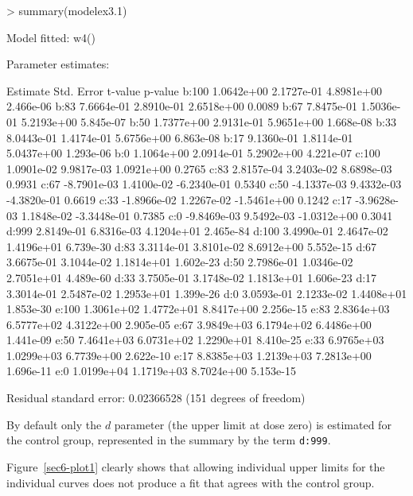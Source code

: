 \documentclass[a4paper]{article}
\begin{document}
\begin{Schunk}
\begin{Sinput}
> summary(modelex3.1)
\end{Sinput}
\begin{Soutput}
Model fitted: w4()

Parameter estimates:

         Estimate  Std. Error     t-value   p-value
b:100  1.0642e+00  2.1727e-01  4.8981e+00 2.466e-06
b:83   7.6664e-01  2.8910e-01  2.6518e+00    0.0089
b:67   7.8475e-01  1.5036e-01  5.2193e+00 5.845e-07
b:50   1.7377e+00  2.9131e-01  5.9651e+00 1.668e-08
b:33   8.0443e-01  1.4174e-01  5.6756e+00 6.863e-08
b:17   9.1360e-01  1.8114e-01  5.0437e+00 1.293e-06
b:0    1.1064e+00  2.0914e-01  5.2902e+00 4.221e-07
c:100  1.0901e-02  9.9817e-03  1.0921e+00    0.2765
c:83   2.8157e-04  3.2403e-02  8.6898e-03    0.9931
c:67  -8.7901e-03  1.4100e-02 -6.2340e-01    0.5340
c:50  -4.1337e-03  9.4332e-03 -4.3820e-01    0.6619
c:33  -1.8966e-02  1.2267e-02 -1.5461e+00    0.1242
c:17  -3.9628e-03  1.1848e-02 -3.3448e-01    0.7385
c:0   -9.8469e-03  9.5492e-03 -1.0312e+00    0.3041
d:999  2.8149e-01  6.8316e-03  4.1204e+01 2.465e-84
d:100  3.4990e-01  2.4647e-02  1.4196e+01 6.739e-30
d:83   3.3114e-01  3.8101e-02  8.6912e+00 5.552e-15
d:67   3.6675e-01  3.1044e-02  1.1814e+01 1.602e-23
d:50   2.7986e-01  1.0346e-02  2.7051e+01 4.489e-60
d:33   3.7505e-01  3.1748e-02  1.1813e+01 1.606e-23
d:17   3.3014e-01  2.5487e-02  1.2953e+01 1.399e-26
d:0    3.0593e-01  2.1233e-02  1.4408e+01 1.853e-30
e:100  1.3061e+02  1.4772e+01  8.8417e+00 2.256e-15
e:83   2.8364e+03  6.5777e+02  4.3122e+00 2.905e-05
e:67   3.9849e+03  6.1794e+02  6.4486e+00 1.441e-09
e:50   7.4641e+03  6.0731e+02  1.2290e+01 8.410e-25
e:33   6.9765e+03  1.0299e+03  6.7739e+00 2.622e-10
e:17   8.8385e+03  1.2139e+03  7.2813e+00 1.696e-11
e:0    1.0199e+04  1.1719e+03  8.7024e+00 5.153e-15

Residual standard error: 0.02366528 (151 degrees of freedom)
\end{Soutput}
\end{Schunk}
By default only the $d$ parameter (the upper limit at dose zero) is estimated for the control group, represented in the summary by the term \verb+d:999+.

Figure~\ref{sec6-plot1} clearly shows that allowing individual upper limits for the individual curves does not produce a fit that agrees with the
control group.
\end{document}
